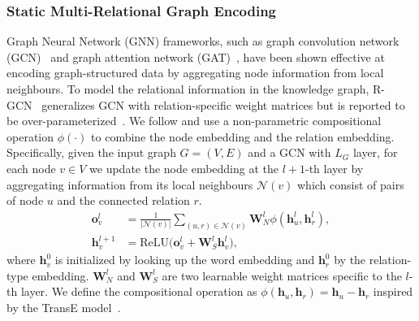 \documentclass[11pt,a4paper]{article}
\begin{document}
\subsubsection{Static Multi-Relational Graph Encoding}\label{sec:static-graph}
Graph Neural Network (GNN) frameworks, such as graph convolution network (GCN)~\citep{Kipf2017SemiSupervisedCW} and graph attention network (GAT)~\citep{Velickovic2018GraphAN}, have been shown effective at encoding graph-structured data by aggregating node information from local neighbours. 
To model the relational information in the knowledge graph, R-GCN~\citep{Schlichtkrull2018ModelingRD} generalizes GCN with relation-specific weight matrices but is reported to be over-parameterized~\citep{Marcheggiani2017EncodingSW, Schlichtkrull2018ModelingRD}. We follow \citet{Vashishth2019CompositionbasedMG} and use a non-parametric compositional operation $\phi(\cdot)$ to combine the node embedding and the relation embedding. Specifically, given the input graph $G=(V, E)$ and a GCN with $L_G$ layer, for each node $v\in V$ we update the node embedding at the $l+1$-th layer by aggregating information from its local neighbours $\mathcal{N}(v)$ which consist of pairs of node $u$ and the connected relation $r$.
\begin{align}
   \bm{o}_v^l &= \frac{1}{|\mathcal{N}(v)|} \sum_{(u, r)\in\mathcal{N}(v)}\mathbf{W}_N^l\phi(\bm{h}_u^l, \bm{h}_r^l), \\
    \bm{h}_v^{l+1}&=\text{ReLU}\Big(\bm{o}_v^l
    + \mathbf{W}_S^l \bm{h}_v^l \Big),
\end{align}
where $\bm{h}_v^0$ is initialized by looking up the word embedding and $\bm{h}_r^0$ by the relation-type embedding.
$\mathbf{W}_N^l$ and $\mathbf{W}_S^l$ are two learnable weight matrices specific to the $l$-th layer. %
We define the compositional operation as $\phi(\bm{h}_u, \bm{h}_r)=\bm{h}_u - \bm{h}_r$ %
inspired by the TransE model~\citep{Bordes2013TranslatingEF}. 
\end{document}
